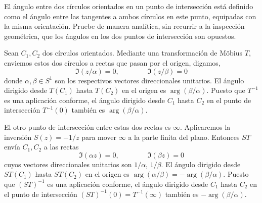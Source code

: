 \begin{exercise}
El ángulo entre dos círculos orientados en un punto de intersección está definido como el ángulo entre las tangentes a ambos círculos en este punto, equipadas con la misma orientación. Pruebe de manera analítica, sin recurrir a la inspección geométrica, que los ángulos en los dos puntos de intersección son opuestos.
\end{exercise}

\begin{solution}
Sean $C_1, C_2$ dos círculos orientados. Mediante una transformación de Möbius $T$, enviemos estos dos círculos a rectas que pasan por el origen, digamos,
$$\Im(z / \alpha) = 0, \qquad \qquad \Im(z / \beta) = 0$$
donde $\alpha, \beta \in S^1$ son los respectivos vectores direccionales unitarios. El ángulo dirigido desde $T(C_1)$ hasta $T(C_2)$ en el origen es $\arg(\beta / \alpha)$. Puesto que $T^{-1}$ es una aplicación conforme, el ángulo dirigido desde $C_1$ hasta $C_2$ en el punto de intersección $T^{-1}(0)$ también es $\arg(\beta / \alpha)$.

El otro punto de intersección entre estas dos rectas es $\infty$. Aplicaremos la inversión $S(z) = -1/z$ para mover $\infty$ a la parte finita del plano. Entonces $ST$ envía $C_1, C_2$ a las rectas
$$\Im(\alpha z) = 0, \qquad \qquad \Im(\beta z) = 0$$
cuyos vectores direccionales unitarios son $1 / \alpha$, $1 / \beta$. El ángulo dirigido desde $ST(C_1)$ hasta $ST(C_2)$ en el origen es $\arg(\alpha / \beta) = -\arg(\beta / \alpha)$. Puesto que $(ST)^{-1}$ es una aplicación conforme, el ángulo dirigido desde $C_1$ hasta $C_2$ en el punto de intersección $(ST)^{-1}(0) = T^{-1}(\infty)$ también es $-\arg(\beta / \alpha)$.
\end{solution}
